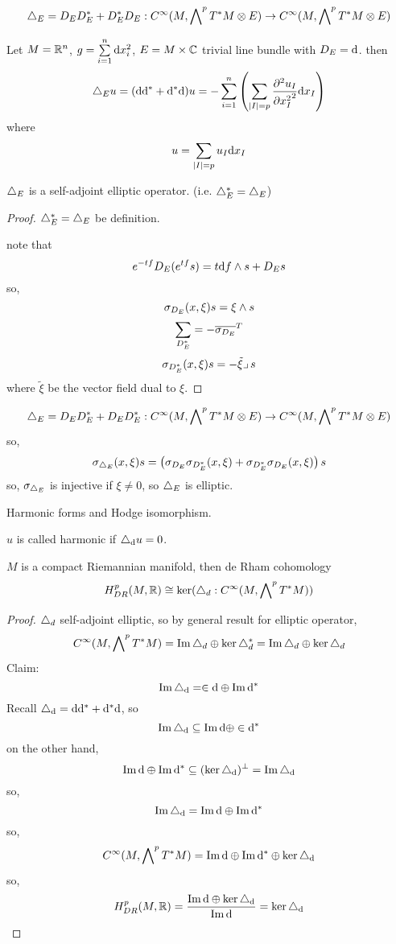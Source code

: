 \begin{definition}
$$\triangle_E=D_ED_E^*+D_E^*D_E:
C^\infty(M,\bigwedge\nolimits^{p}T^*M\otimes E)
\to
C^\infty(M,\bigwedge\nolimits^{p}T^*M\otimes E)
$$
\end{definition}

\begin{example}
Let $M=\mathbb{R}^n$, $g=\sum\limits_{i=1}^n\mathrm{d} x_i^2$,
$E=M\times \mathbb{C}$ trivial line bundle with $D_E=\mathrm{d}$.
then
$$\triangle_Eu=(\mathrm{d}\mathrm{d}^*+\mathrm{d}^*\mathrm{d})u=
-\sum_{i=1}^n
  \left(
    \sum_{|I|=p}
    \frac{\partial^2{u_I}} {\partial{x_I^2}^2}
    \mathrm{d} x_I
  \right)
$$
where
$$u=\sum_{|I|=p}u_I\mathrm{d} x_I$$
\end{example}

\begin{prop}
$\triangle_E$ is a self-adjoint elliptic operator.
(i.e. $\triangle_E^*=\triangle_E$)
\end{prop}
\begin{proof}
$\triangle_E^*=\triangle_E$ be definition.

note that
$$e^{-tf}D_E(e^{tf}s)=t\mathrm{d} f\wedge s+D_Es$$
so,
$$\sigma_{D_E}(x,\xi)s=\xi\wedge s$$
$$\sum_{D^*_E}=-\overline{\sigma_{D_E}}^T$$
$$\sigma_{D^*_E}(x,\xi)s=-\tilde{\xi}\lrcorner\, s$$
where $\tilde{\xi}$ be the vector field dual to $\xi$.
\end{proof}

\begin{definition}
$$\triangle_E=D_ED_E^*+D_ED_E^*:
C^\infty(M,\bigwedge\nolimits^{p}T^*M\otimes E)\to
C^\infty(M,\bigwedge\nolimits^{p}T^*M\otimes E)$$
so,
$$\sigma_{\triangle_E}(x,\xi)s=
 \left(
   \sigma_{D_E}\sigma_{D_E^*}(x,\xi)
   +\sigma_{D_E^*}\sigma_{D_E}(x,\xi)
 \right)s
$$
so,
$\sigma_{\triangle_E}$ is injective if $\xi\neq 0$, so $\triangle_E$ is elliptic.
\end{definition}

Harmonic forms and Hodge isomorphism.
\begin{definition}
$u$ is called harmonic if $\triangle_{\mathrm{d}}u=0$.
\end{definition}

\begin{thm}
$M$ is a compact Riemannian manifold,
then de Rham cohomology
$$H^p_{DR}(M,\mathbb{R})\cong
\ker(\triangle_d:C^\infty(M,\bigwedge\nolimits^{p}T^*M))
$$
\end{thm}
\begin{proof}
$\triangle_d$ self-adjoint elliptic, so by general result for elliptic operator,
$$C^\infty(M,\bigwedge\nolimits^{p}T^*M)=\operatorname{Im}\triangle_d\oplus\ker\triangle_d^*
=\operatorname{Im}\triangle_d\oplus\ker\triangle_d$$
Claim:
$$\operatorname{Im}\triangle_{\mathrm{d}}=\in \mathrm{d}\oplus\operatorname{Im}\mathrm{d}^*$$
Recall $\triangle_{\mathrm{d}}=\mathrm{d}\mathrm{d}^*+\mathrm{d}^*\mathrm{d}$, so
$$\operatorname{Im}\triangle_{\mathrm{d}}\subseteq\operatorname{Im}\mathrm{d}\oplus\in\mathrm{d}^*$$
on the other hand,
$$\operatorname{Im}\mathrm{d}\oplus\operatorname{Im}\mathrm{d}^*\subseteq(\ker\triangle_{\mathrm{d}})^\bot=\operatorname{Im}\triangle_{\mathrm{d}}$$
so,
$$\operatorname{Im}\triangle_{\mathrm{d}}=\operatorname{Im}\mathrm{d}\oplus\operatorname{Im}\mathrm{d}^*$$
so,
$$C^\infty(M,\bigwedge\nolimits^{p}T^*M)=
\operatorname{Im}\mathrm{d}\oplus\operatorname{Im}\mathrm{d}^*\oplus\ker\triangle_{\mathrm{d}}
$$
so,
$$
  H^p_{DR}(M,\mathbb{R})
=\frac{\operatorname{Im}\mathrm{d}\oplus\ker\triangle_{\mathrm{d}}}{\operatorname{Im}\mathrm{d}}=\ker\triangle_{\mathrm{d}}
$$
\end{proof}

